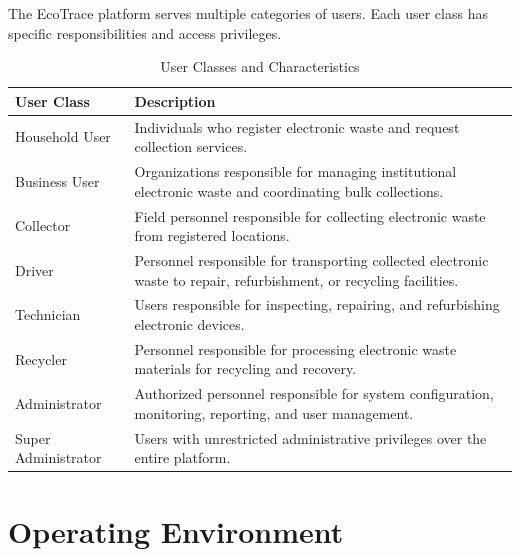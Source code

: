 The EcoTrace platform serves multiple categories of users. Each user
class has specific responsibilities and access privileges.

\begin{table}[H]
\centering
\caption{User Classes and Characteristics}
\label{tab:user_classes}
\small

\begin{tabular}{|p{4cm}|p{10cm}|}

\hline
\textbf{User Class} &
\textbf{Description} \\
\hline

Household User &
Individuals who register electronic waste and request collection
services. \\
\hline

Business User &
Organizations responsible for managing institutional electronic waste
and coordinating bulk collections. \\
\hline

Collector &
Field personnel responsible for collecting electronic waste from
registered locations. \\
\hline

Driver &
Personnel responsible for transporting collected electronic waste to
repair, refurbishment, or recycling facilities. \\
\hline

Technician &
Users responsible for inspecting, repairing, and refurbishing
electronic devices. \\
\hline

Recycler &
Personnel responsible for processing electronic waste materials for
recycling and recovery. \\
\hline

Administrator &
Authorized personnel responsible for system configuration, monitoring,
reporting, and user management. \\
\hline

Super Administrator &
Users with unrestricted administrative privileges over the entire
platform. \\
\hline

\end{tabular}

\end{table}

\section{Operating Environment}
\label{sec:operating-environment}

